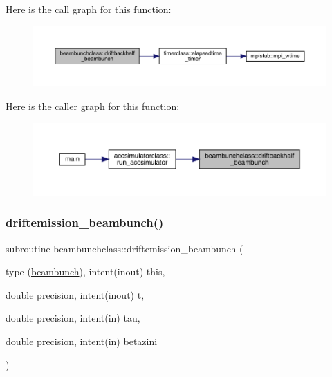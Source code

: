 Here is the call graph for this function\+:\nopagebreak
\begin{figure}[H]
\begin{center}
\leavevmode
\includegraphics[width=350pt]{namespacebeambunchclass_ae62dcc6dbc6d31b22daefa701822d49d_cgraph}
\end{center}
\end{figure}
Here is the caller graph for this function\+:\nopagebreak
\begin{figure}[H]
\begin{center}
\leavevmode
\includegraphics[width=350pt]{namespacebeambunchclass_ae62dcc6dbc6d31b22daefa701822d49d_icgraph}
\end{center}
\end{figure}
\mbox{\label{namespacebeambunchclass_a2c80320f40c450b5384dfd16c76bcc6a}} 
\subsubsection{\texorpdfstring{driftemission\_beambunch()}{driftemission\_beambunch()}}
{\footnotesize\ttfamily subroutine beambunchclass\+::driftemission\+\_\+beambunch (\begin{DoxyParamCaption}\item[{type (\mbox{\hyperlink{namespacebeambunchclass_structbeambunchclass_1_1beambunch}{beambunch}}), intent(inout)}]{this,  }\item[{double precision, intent(inout)}]{t,  }\item[{double precision, intent(in)}]{tau,  }\item[{double precision, intent(in)}]{betazini }\end{DoxyParamCaption})}



